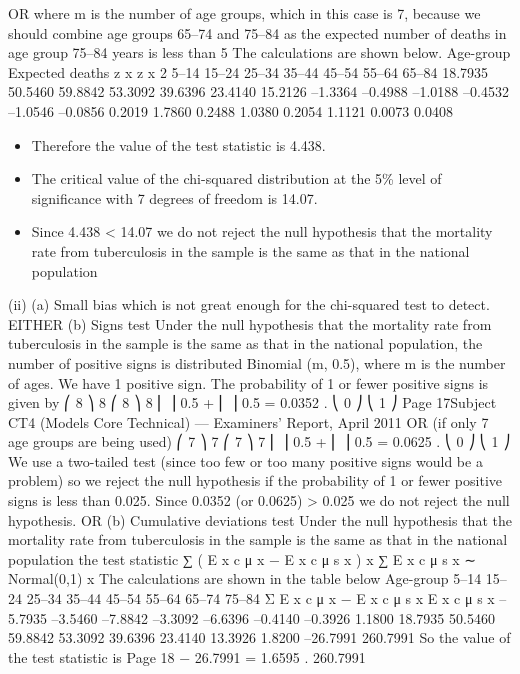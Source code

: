 \documentclass[a4paper,12pt]{article}
\begin{document}
\begin{enumerate}
OR
where m is the number of age groups, which in this case is 7, because we should combine age groups 65–74 and 75–84 as the expected number of deaths in age group 75–84 years is less than 5
The calculations are shown below.
Age-group Expected deaths z x z x 2
5–14
15–24
25–34
35–44
45–54
55–64
65–84 18.7935
50.5460
59.8842
53.3092
39.6396
23.4140
15.2126 –1.3364
–0.4988
–1.0188
–0.4532
–1.0546
–0.0856
0.2019 1.7860
0.2488
1.0380
0.2054
1.1121
0.0073
0.0408
\begin{itemize}
\item Therefore the value of the test statistic is 4.438.
\item The critical value of the chi-squared distribution at the 5\% level of significance with 7
degrees of freedom is 14.07.
\item Since 4.438 < 14.07 we do not reject the null hypothesis that the mortality rate from tuberculosis in the sample is the same as that in the national population
\end{itemize}
(ii)
(a)
Small bias which is not great enough for the chi-squared test to detect.
EITHER
(b)
Signs test
Under the null hypothesis that the mortality rate from tuberculosis in the sample is the same as that in the national population,
the number of positive signs is distributed Binomial (m, 0.5), where m is the number of ages.
We have 1 positive sign.
The probability of 1 or fewer positive signs is given by
⎛ 8 ⎞ 8 ⎛ 8 ⎞ 8
⎜ ⎟ 0.5 + ⎜ ⎟ 0.5 = 0.0352 .
⎝ 0 ⎠
⎝ 1 ⎠
Page 17Subject CT4 (Models Core Technical) — Examiners’ Report, April 2011
OR (if only 7 age groups are being used)
⎛ 7 ⎞ 7 ⎛ 7 ⎞ 7
⎜ ⎟ 0.5 + ⎜ ⎟ 0.5 = 0.0625 .
⎝ 0 ⎠
⎝ 1 ⎠
We use a two-tailed test (since too few or too many positive signs would be a
problem)
so we reject the null hypothesis if the probability of 1 or fewer positive signs
is less than 0.025.
Since 0.0352 (or 0.0625) > 0.025
we do not reject the null hypothesis.
OR
(b)
Cumulative deviations test
Under the null hypothesis that the mortality rate from tuberculosis in the sample is the same as that in the national population
the test statistic
∑ ( E x c μ x − E x c μ s x )
x
∑ E x c μ s x
∼ Normal(0,1)
x
The calculations are shown in the table below
Age-group
5–14
15–24
25–34
35–44
45–54
55–64
65–74
75–84
Σ
E x c μ x − E x c μ s x E x c μ s x
–5.7935
–3.5460
–7.8842
–3.3092
–6.6396
–0.4140
–0.3926
1.1800 18.7935
50.5460
59.8842
53.3092
39.6396
23.4140
13.3926
1.8200
–26.7991 260.7991
So the value of the test statistic is
Page 18
− 26.7991
= 1.6595 .
260.7991


\end{enumerate}
\end{document}

